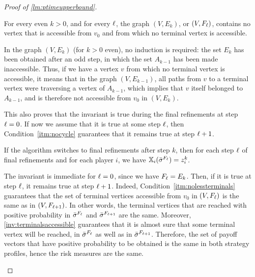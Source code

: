 \begin{proof}[Proof of \cref{lm:ptimeupperbound}]
\begin{invariant}\label{inv:terminalsaccessible}
    For every even $k > 0$, and for every $\ell$, the graph $(V, E_k)$, or $(V, F_\ell)$, contains no vertex that is accessible from $v_0$ and from which no terminal vertex is accessible.
\end{invariant}

\begin{claimproof}
    In the graph $(V, E_k)$ (for $k>0$ even), no induction is required: the set $E_k$ has been obtained after an odd step, in which the set $A_{k-1}$ has been made inaccessible.
    Thus, if we have a vertex $v$ from which no terminal vertex is accessible, it means that in the graph $(V, E_{k-1})$, all paths from $v$ to a terminal vertex were traversing a vertex of $A_{k-1}$, which implies that $v$ itself belonged to $A_{k-1}$, and is therefore not accessible from $v_0$ in $(V, E_k)$.

    This also proves that the invariant is true during the final refinements at step $\ell = 0$.
    If now we assume that it is true at some step $\ell$, then Condition~\ref{itm:nocycle} guarantees that it remains true at step $\ell+1$.
\end{claimproof}


\begin{invariant} \label{inv:finishingtouchesconstantpayoff}
    If the algorithm switches to final refinements after step $k$, then for each step $\ell$ of final refinements and for each player $i$, we have $\mathbb{X}_i({\bar{\sigma}}^{F_\ell}) = z_i^k$.
\end{invariant}

\begin{claimproof}
    The invariant is immediate for $\ell=0$, since we have $F_\ell = E_k$.
    Then, if it is true at step $\ell$, it remains true at step $\ell+1$.
    Indeed, Condition~\ref{itm:nolessterminals} guarantees that the set of terminal vertices accessible from $v_0$ in $(V, F_\ell)$ is the same as in $(V, F_{\ell+1})$.
    In other words, the terminal vertices that are reached with positive probability in ${\bar{\sigma}}^{F_\ell}$ and ${\bar{\sigma}}^{F_{\ell+1}}$ are the same.
    Moreover, \cref{inv:terminalsaccessible} guarantees that it is almost sure that some terminal vertex will be reached, in ${\bar{\sigma}}^{F_\ell}$ as well as in ${\bar{\sigma}}^{F_{\ell+1}}$.
    Therefore, the set of payoff vectors that have positive probability to be obtained is the same in both strategy profiles, hence the risk measures are the same.
\end{claimproof}



\end{proof}
